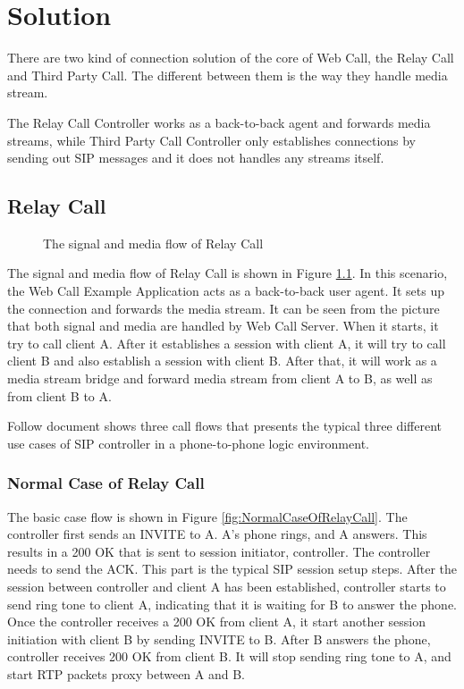 \chapter{Solution}
\label{sec:Solution}

There are two kind of connection solution of the core of Web Call, the Relay Call and Third Party Call. The different between them is the way they handle media stream.

The Relay Call Controller works as a back-to-back agent and forwards media streams, while Third Party Call Controller only establishes connections by sending out SIP messages and it does not handles any streams itself. 

\section{Relay Call}
\label{sec:Solution:RelayCall}

\begin{figure}[!hbtp]
\centering
{}
\caption{The signal and media flow of Relay Call}
\label{fig:TheSignalAndMediaFlowOfRelayCall}
\end{figure}

The signal and media flow of Relay Call is shown in Figure \ref{fig:TheSignalAndMediaFlowOfRelayCall}. In this scenario, the Web Call Example Application acts as a back-to-back user agent. It sets up the connection and forwards the media stream. It can be seen from the picture that both signal and media are handled by Web Call Server. When it starts, it try to call client A. After it establishes a session with client A, it will try to call client B and also establish a session with client B. After that, it will work as a media stream bridge and forward media stream from client A to B, as well as from client B to A.


Follow document shows three call flows that presents the typical three different use cases of SIP controller in a phone-to-phone logic environment.

\subsection{Normal Case of Relay Call}
\label{sec:Solution:RelayCall:NormalCaseOfRelayCall}

The basic case flow is shown in Figure \ref{fig:NormalCaseOfRelayCall}. The controller first sends an INVITE to A. A's phone rings, and A answers. This results in a 200 OK that is sent to session initiator, controller. The controller needs to send the ACK. This part is the typical SIP session setup steps. After the session between controller and client A has been established, controller starts to send ring tone to client A, indicating that it is waiting for B to answer the phone. Once the controller receives a 200 OK from client A, it start another session initiation with client B by sending INVITE to B. After B answers the phone, controller receives 200 OK from client B. It will stop sending ring tone to A, and start RTP packets proxy between A and B.

